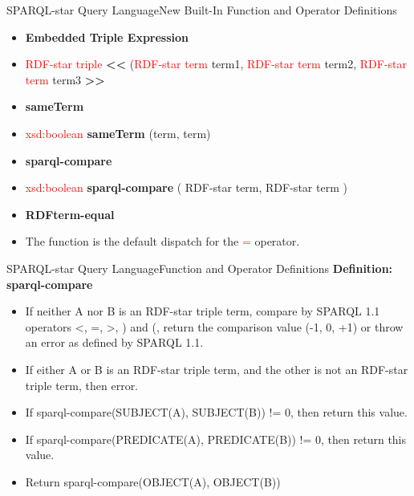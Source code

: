 \documentclass[aspectratio=169]{beamer}
\begin{document}
\begin{frame}{SPARQL-star Query Language}{New Built-In Function and Operator Definitions}
\begin{itemize}
    \item \textbf{Embedded Triple Expression}
    \item[] \textcolor{red}{RDF-star triple} \textbf{<<} (\textcolor{red}{RDF-star term} term1, \textcolor{red}{RDF-star term} term2, \textcolor{red}{RDF-star term} term3 \textbf{>>}
    \item \textbf{sameTerm}
    \item[] \textcolor{red}{xsd:boolean} \textbf{sameTerm} (term, term)
    \item \textbf{sparql-compare}
    \item[] \textcolor{red}{xsd:boolean} \textbf{sparql-compare} ( RDF-star term, RDF-star term )
    \item \textbf{RDFterm-equal}
    \item[] The function is the default dispatch for the \textcolor{red}{=} operator.
\end{itemize}
\end{frame}

\begin{frame}{SPARQL-star Query Language}{Function and Operator Definitions}
\textbf{Definition: sparql-compare}
\begin{itemize}
    \item If neither A nor B is an RDF-star triple term, compare by SPARQL 1.1 operators <, =, >, ) and (, return the comparison value (-1, 0, +1) or throw an error as defined by SPARQL 1.1.
    \item If either A or B is an RDF-star triple term, and the other is not an RDF-star triple term, then error.
    \item If sparql-compare(SUBJECT(A), SUBJECT(B)) != 0, then return this value.
    \item If sparql-compare(PREDICATE(A), PREDICATE(B)) != 0, then return this value.
    \item Return sparql-compare(OBJECT(A), OBJECT(B))
\end{itemize}
\end{frame}
\end{document}
